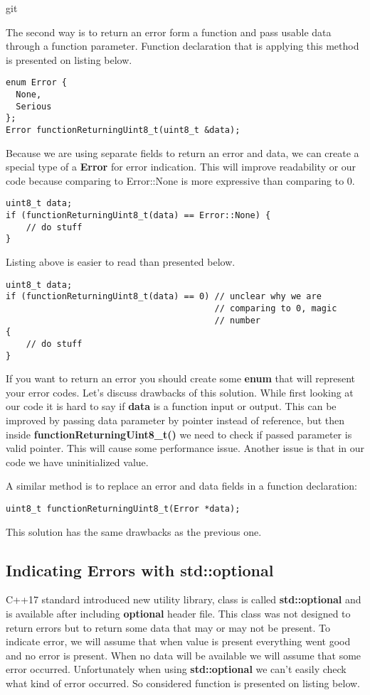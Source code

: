git \documentclass{article}
\let\Oldsubsection\subsection
\renewcommand{\subsection}{\FloatBarrier\Oldsubsection}
\begin{document}
The second way is to return an error form a function and pass usable data through a function parameter. Function declaration that is applying this method is presented on listing below.
\begin{lstlisting}
enum Error {
  None,
  Serious
};
Error functionReturningUint8_t(uint8_t &data);
\end{lstlisting}
Because we are using separate fields to return an error and data, we can create a special type of a \textbf{Error} for error indication. This will improve readability or our code because comparing to Error::None is more expressive than comparing to 0. 
\begin{lstlisting}
uint8_t data; 
if (functionReturningUint8_t(data) == Error::None) {
    // do stuff
}
\end{lstlisting}
Listing above is easier to read than presented below.
\begin{lstlisting}
uint8_t data;
if (functionReturningUint8_t(data) == 0) // unclear why we are 
                                         // comparing to 0, magic
                                         // number
{
    // do stuff
}
\end{lstlisting}

If you want to return an error you should create some \textbf{enum} that will represent your error codes.\newline
Let's discuss drawbacks of this solution. While first looking at our code it is hard to say if \textbf{data} is a function input or output. This can be improved by passing data parameter by pointer instead of reference, but then inside \textbf{functionReturningUint8\_t()} we need to check if passed parameter is valid pointer. This will cause some performance issue. Another issue is that in our code we have uninitialized value.

A similar method is to replace an error and data fields in a function declaration:
\begin{lstlisting}
uint8_t functionReturningUint8_t(Error *data);
\end{lstlisting}

This solution has the same drawbacks as the previous one.

\subsection{Indicating Errors with std::optional}
C++17 standard introduced new utility library, class is called \textbf{std::optional} and is available after including \textbf{optional} header file. This class was not designed to return errors but to return some data that may or may not be present. To indicate error, we will assume that when value is present everything went good and no error is present. When no data will be available we will assume that some error occurred. Unfortunately when using \textbf{std::optional} we can't easily check what kind of error occurred. So considered function is presented on listing below.
\end{document}
